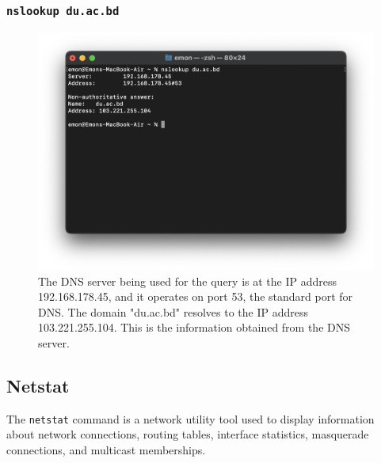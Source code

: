 \documentclass[11pt]{article}
\newcommand{\terminal}[1]{\texttt{\color{terminalcolor}#1}}
\begin{document}
\subsubsection{\terminal{nslookup du.ac.bd}}
\begin{figure}[!h]
    \centering
    \includegraphics[width=\textwidth]{nslookup.png}
    \caption{The DNS server being used for the query is at the IP address 192.168.178.45, and it operates on port 53, the standard port for DNS. The domain "du.ac.bd" resolves to the IP address 103.221.255.104. This is the information obtained from the DNS server.}
\end{figure}

\newpage



\subsection{Netstat}
The \terminal {netstat}  command is a network utility tool used to display information about network connections, routing tables, interface statistics, masquerade connections, and multicast memberships.
\end{document}
